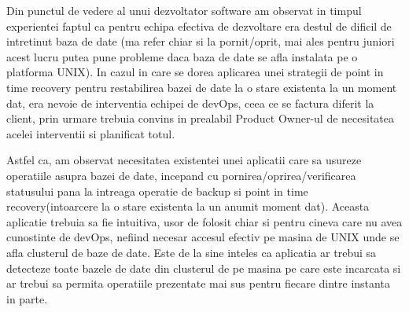 Din punctul de vedere al unui dezvoltator software am observat in timpul experientei faptul ca pentru echipa efectiva de dezvoltare era destul de dificil de intretinut baza de date (ma refer chiar si la pornit/oprit, mai ales pentru juniori acest lucru putea pune probleme daca baza de date se afla instalata pe o platforma UNIX). In cazul in care se dorea aplicarea unei strategii de point in time recovery pentru restabilirea bazei de date la o stare existenta la un moment dat, era nevoie de interventia echipei de devOps, ceea ce se factura diferit la client, prin urmare trebuia convins in prealabil Product Owner-ul de necesitatea acelei interventii si planificat totul.
\par
Astfel ca, am observat necesitatea existentei unei aplicatii care sa usureze operatiile asupra bazei de date, incepand cu pornirea/oprirea/verificarea statusului pana la intreaga operatie de backup si point in time recovery(intoarcere la o stare existenta la un anumit moment dat). Aceasta aplicatie trebuia sa fie intuitiva, usor de folosit chiar si pentru cineva care nu avea cunostinte de devOps, nefiind necesar accesul efectiv pe masina de UNIX unde se afla clusterul de baze de date. Este de la sine inteles ca aplicatia ar trebui sa detecteze toate bazele de date din clusterul de pe masina pe care este incarcata si ar trebui sa permita operatiile prezentate mai sus pentru fiecare dintre instanta in parte.
